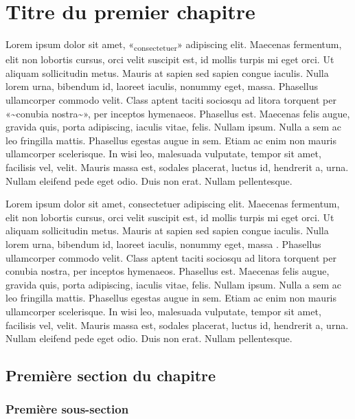 \hypertarget{titre-du-premier-chapitre}{%
\chapter{Titre du premier chapitre}\label{titre-du-premier-chapitre}}

Lorem ipsum dolor sit amet, «\textsubscript{consectetuer}» adipiscing
elit. Maecenas fermentum, elit non lobortis cursus, orci velit suscipit
est, id mollis turpis mi eget orci. Ut aliquam sollicitudin metus.
Mauris at sapien sed sapien congue iaculis. Nulla lorem urna, bibendum
id, laoreet iaculis, nonummy eget, massa. Phasellus ullamcorper commodo
velit. Class aptent taciti sociosqu ad litora torquent per
«\textasciitilde conubia nostra\textasciitilde», per inceptos hymenaeos.
Phasellus est. Maecenas felis augue, gravida quis, porta adipiscing,
iaculis vitae, felis. Nullam ipsum. Nulla a sem ac leo fringilla mattis.
Phasellus egestas augue in sem. Etiam ac enim non mauris ullamcorper
scelerisque. In wisi leo, malesuada vulputate, tempor sit amet,
facilisis vel, velit. Mauris massa est, sodales placerat, luctus id,
hendrerit a, urna. Nullam eleifend pede eget odio. Duis non erat. Nullam
pellentesque.

Lorem ipsum dolor sit amet, consectetuer adipiscing elit. Maecenas
fermentum, elit non lobortis cursus, orci velit suscipit est, id mollis
turpis mi eget orci. Ut aliquam sollicitudin metus. Mauris at sapien sed
sapien congue iaculis. Nulla lorem urna, bibendum id, laoreet iaculis,
nonummy eget, massa \autocite{Pierre1901}. Phasellus ullamcorper commodo
velit. Class aptent taciti sociosqu ad litora torquent per conubia
nostra, per inceptos hymenaeos. Phasellus est. Maecenas felis augue,
gravida quis, porta adipiscing, iaculis vitae, felis. Nullam ipsum.
Nulla a sem ac leo fringilla mattis. Phasellus egestas augue in sem.
Etiam ac enim non mauris ullamcorper scelerisque. In wisi leo, malesuada
vulputate, tempor sit amet, facilisis vel, velit. Mauris massa est,
sodales placerat, luctus id, hendrerit a, urna. Nullam eleifend pede
eget odio. Duis non erat. Nullam pellentesque.

\hypertarget{premiuxe8re-section-du-chapitre}{%
\section{Première section du
chapitre}\label{premiuxe8re-section-du-chapitre}}

\hypertarget{premiuxe8re-sous-section}{%
\subsection{Première sous-section}\label{premiuxe8re-sous-section}}

